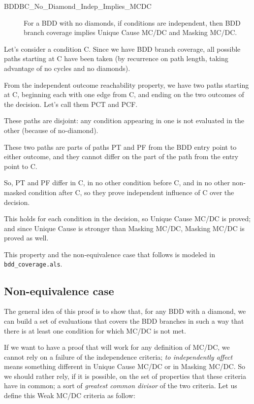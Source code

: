 \documentclass[a4paper,12pt,twoside]{article}
\newcommand{\alloyspec}[1]{\texttt{#1}}
\begin{document}
\begin{description}
\item[BDDBC\_No\_Diamond\_Indep\_Implies\_MCDC]
  For a BDD with no diamonds, if conditions are independent, then
  BDD branch coverage implies Unique Cause MC/DC and Masking MC/DC.
\end{description}

Let's consider a condition C. Since we have BDD branch coverage,
all possible paths starting at C have been taken (by recurrence on path
length, taking advantage of no cycles and no diamonds).

From the independent outcome reachability property, we have two paths
starting at C, beginning each with one edge from C, and ending on the
two outcomes of the decision. Let's call them PCT and PCF.

These paths are disjoint: any condition appearing in one is not evaluated
in the other (because of no-diamond).

These two paths are parts of paths PT and PF from the BDD entry point to
either outcome, and they cannot differ on the part of the path from the
entry point to C.

So, PT and PF differ in C, in no other condition before C, and in no
other non-masked condition after C, so they prove independent influence
of C over the decision.

This holds for each condition in the decision, so Unique Cause MC/DC
is proved; and since Unique Cause is stronger than Masking MC/DC,
Masking MC/DC is proved as well.

This property and the non-equivalence case that follows is modeled
in \alloyspec{bdd\_coverage.als}.

\subsection{Non-equivalence case}

The general idea of this proof is to show that, for any BDD with a
diamond, we can build a set of evaluations that covers the BDD
branches in such a way that there is at least one condition for which
MC/DC is not met.

If we want to have a proof that will work for any definition of MC/DC,
we cannot rely on a failure of the independence criteria; \textit{to
independently affect} means something different in Unique Cause MC/DC
or in Masking MC/DC. So we should rather rely, if it is possible, on
the set of properties that these criteria have in common; a sort of
\textit{greatest common divisor} of the two criteria. Let us define
this Weak MC/DC criteria as follow:
\end{document}
